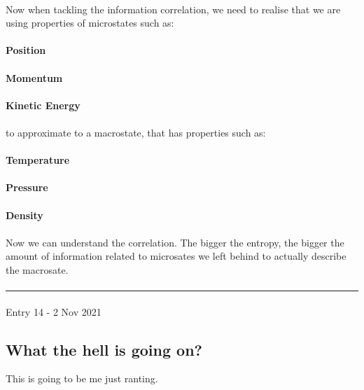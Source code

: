 \documentclass[12pt,  letterpaper]{article}
\begin{document}
\paragraph*{}
Now when tackling the information correlation, we need to realise that we are using properties of microstates such as:\paragraph*{}
\textbf{Position}
\paragraph*{}
\textbf{Momentum}
\paragraph*{}
\textbf{Kinetic Energy}
\paragraph*{}
to approximate to a macrostate, that has properties such as:
\paragraph*{}
\textbf{Temperature}
\paragraph*{}
\textbf{Pressure}
\paragraph*{}
\textbf{Density}
\paragraph*{}
Now we can understand the correlation. The bigger the entropy, the bigger the amount of information related to microsates we left behind to actually describe the macrosate.
\paragraph*{}
\hrule
\paragraph*{}
Entry 14 - 2 Nov 2021
\subsection*{What the hell is going on?}
This is going to be me just ranting.
\end{document}
